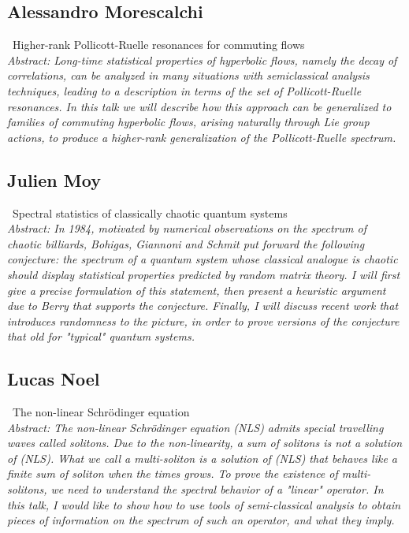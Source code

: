 \documentclass[12pt,a4paper]{amsart}
\begin{document}
\bigskip

\subsection*{Alessandro Morescalchi} \, Higher-rank Pollicott-Ruelle resonances for commuting flows \smallskip \\
\textit{Abstract: Long-time statistical properties of hyperbolic flows, namely the decay of correlations, can be analyzed in many situations with semiclassical analysis techniques, leading to a description in terms of the set of Pollicott-Ruelle resonances. In this talk we will describe how this approach can be generalized to families of commuting hyperbolic flows, arising naturally through Lie group actions, to produce a higher-rank generalization of the Pollicott-Ruelle spectrum.}

\bigskip

\subsection*{Julien Moy} \,  Spectral statistics of classically chaotic quantum systems \medskip \\
\textit{Abstract: In 1984, motivated by numerical observations on the spectrum of chaotic billiards, Bohigas, Giannoni and Schmit put forward the following conjecture: the spectrum of a quantum system whose classical analogue is chaotic should display statistical properties predicted by random matrix theory. I will first give a precise formulation of this statement, then present a heuristic argument due to Berry that supports the conjecture. Finally, I will discuss recent work that introduces randomness to the picture, in order to prove versions of the conjecture that old for "typical" quantum systems.}

\bigskip

\subsection*{Lucas Noel} \, The non-linear Schrödinger equation \smallskip \\
\textit{Abstract: The non-linear Schrödinger equation (NLS) admits special travelling waves called solitons. Due to the non-linearity, a sum of solitons is not a solution of (NLS). What we call a multi-soliton is a solution of (NLS) that behaves like a finite sum of soliton when the times grows. To prove the existence of multi-solitons, we need to understand the spectral behavior of a "linear" operator. In this talk, I would like to show how to use tools of semi-classical analysis to obtain pieces of information on the spectrum of such an operator, and what they imply.}
\end{document}
